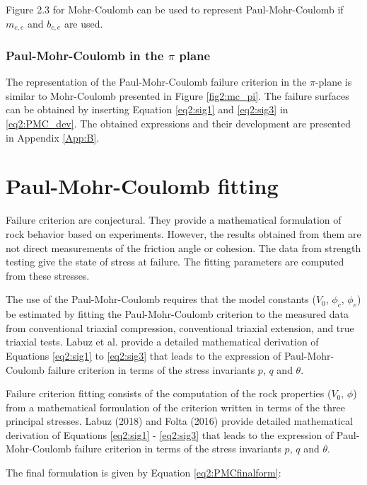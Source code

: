 Figure 2.3 for Mohr-Coulomb can be used to represent Paul-Mohr-Coulomb if $m_{c,e}$ and $b_{c,e}$ are used.

\subsubsection{Paul-Mohr-Coulomb in the \texorpdfstring{$\pi$}{pi} plane}\label{ch2:PMC_pi}

The representation of the Paul-Mohr-Coulomb failure criterion in the $\pi$-plane is similar to Mohr-Coulomb presented in Figure \ref{fig2:mc_pi}. The failure surfaces can be obtained by inserting Equation \ref{eq2:sig1} and \ref{eq2:sig3} in \ref{eq2:PMC_dev}. The obtained expressions and their development are presented in Appendix \ref{App:B}. 

\section{Paul-Mohr-Coulomb fitting }\label{ch2:pmcfit}

Failure criterion are conjectural. They provide a mathematical formulation of rock behavior based on experiments. However, the results obtained from them are not direct measurements of the friction angle or cohesion. The data from strength testing give the state of stress at failure. The fitting parameters are computed from these stresses.

The use of the Paul-Mohr-Coulomb requires that the model constants ($V_0$, $\phi_c$, $\phi_e$) be estimated by fitting the Paul-Mohr-Coulomb criterion to the measured data from conventional triaxial compression, conventional triaxial extension, and true triaxial tests. Labuz et al. \cite{Labuz2018} provide a detailed mathematical derivation of Equations \ref{eq2:sig1} to \ref{eq2:sig3} that leads to the expression of Paul-Mohr-Coulomb failure criterion in terms of the stress invariants $p$, $q$ and $\theta$. 

Failure criterion fitting consists of the computation of the rock properties ($V_0$, $\phi$) from a mathematical formulation of the criterion written in terms of the three principal stresses. Labuz (2018) \cite{Labuz2018} and Folta (2016) \cite{Folta2016} provide detailed mathematical derivation of Equations \ref{eq2:sig1} - \ref{eq2:sig3} that leads to the expression of Paul-Mohr-Coulomb failure criterion in terms of the stress invariants $p$, $q$  and $\theta$. 

The final formulation is given by Equation \ref{eq2:PMCfinalform}:

